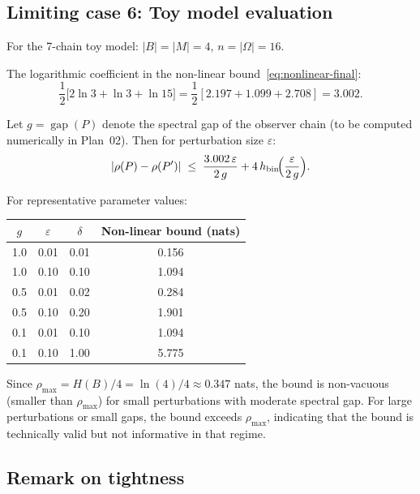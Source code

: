 \documentclass[11pt]{article}
\DeclareMathOperator{\gap}{gap}
\begin{document}
\subsection{Limiting case 6: Toy model evaluation}

For the 7-chain toy model: $|B| = |M| = 4$, $n = |\Omega| = 16$.

The logarithmic coefficient in the non-linear bound~\eqref{eq:nonlinear-final}:
\[
  \frac{1}{2}\bigl[2\ln 3 + \ln 3 + \ln 15\bigr]
  = \frac{1}{2}[2.197 + 1.099 + 2.708] = 3.002.
\]

Let $g = \gap(P)$ denote the spectral gap of the observer chain
(to be computed numerically in Plan~02).  Then for perturbation
size $\varepsilon$:
\[
  |\rho(P) - \rho(P')| \;\le\;
  \frac{3.002\,\varepsilon}{2\,g}
  + 4\,h_{\mathrm{bin}}\!\Bigl(\frac{\varepsilon}{2\,g}\Bigr).
\]

For representative parameter values:
\begin{center}
\begin{tabular}{cccc}
  $g$ & $\varepsilon$ & $\delta$ & Non-linear bound (nats) \\
  \hline
  1.0 & 0.01 & 0.01 & 0.156 \\
  1.0 & 0.10 & 0.10 & 1.094 \\
  0.5 & 0.01 & 0.02 & 0.284 \\
  0.5 & 0.10 & 0.20 & 1.901 \\
  0.1 & 0.01 & 0.10 & 1.094 \\
  0.1 & 0.10 & 1.00 & 5.775
\end{tabular}
\end{center}

Since $\rho_{\max} = H(B)/4 = \ln(4)/4 \approx 0.347$ nats, the bound
is non-vacuous (smaller than $\rho_{\max}$) for small perturbations
with moderate spectral gap.  For large perturbations or small gaps,
the bound exceeds $\rho_{\max}$, indicating that the bound is
technically valid but not informative in that regime.

\subsection{Remark on tightness}
\end{document}
